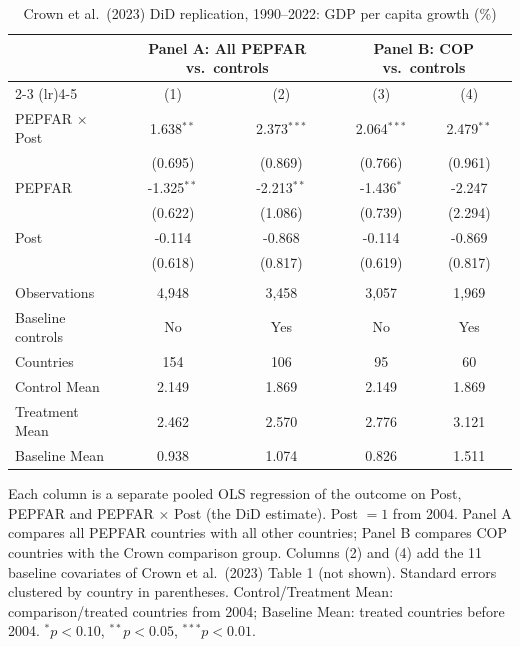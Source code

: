
\begin{table}[htbp]
   \caption{\label{tab:crown_did_gdp_pc_growth} Crown et al.\ (2023) DiD replication, 1990--2022: GDP per capita growth (\%)}
   \bigskip
   \centering
   \begin{tabular}{lcccc}
      \toprule
       & \multicolumn{2}{c}{Panel A: All PEPFAR vs.\ controls} & \multicolumn{2}{c}{Panel B: COP vs.\ controls} \\ \cmidrule(lr){2-3} \cmidrule(lr){4-5}
                            & (1)           & (2)           & (3)           & (4)\\  
      \midrule 
      PEPFAR $\times$ Post  & 1.638$^{**}$  & 2.373$^{***}$ & 2.064$^{***}$ & 2.479$^{**}$\\   
                            & (0.695)       & (0.869)       & (0.766)       & (0.961)\\   
      PEPFAR                & -1.325$^{**}$ & -2.213$^{**}$ & -1.436$^{*}$  & -2.247\\   
                            & (0.622)       & (1.086)       & (0.739)       & (2.294)\\   
      Post                  & -0.114        & -0.868        & -0.114        & -0.869\\   
                            & (0.618)       & (0.817)       & (0.619)       & (0.817)\\   
       \\
      Observations          & 4,948         & 3,458         & 3,057         & 1,969\\  
      Baseline controls     & No            & Yes           & No            & Yes\\  
      Countries             & 154           & 106           & 95            & 60\\  
      Control Mean          & 2.149         & 1.869         & 2.149         & 1.869\\  
      Treatment Mean        & 2.462         & 2.570         & 2.776         & 3.121\\  
      Baseline Mean         & 0.938         & 1.074         & 0.826         & 1.511\\  
      \bottomrule
   \end{tabular}
   
   \par \raggedright 
   Each column is a separate pooled OLS regression of the outcome on Post, PEPFAR and PEPFAR $\times$ Post (the DiD estimate). Post $= 1$ from 2004. Panel A compares all PEPFAR countries with all other countries; Panel B compares COP countries with the Crown comparison group. Columns (2) and (4) add the 11 baseline covariates of Crown et al.\ (2023) Table 1 (not shown). Standard errors clustered by country in parentheses. Control/Treatment Mean: comparison/treated countries from 2004; Baseline Mean: treated countries before 2004. $^{*}p<0.10$, $^{**}p<0.05$, $^{***}p<0.01$.
\end{table}


